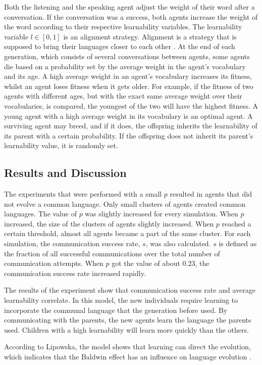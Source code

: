 Both the listening and the speaking agent adjust the weight of their word after a conversation. If the conversation was a success, both agents increase the weight of the word according to their respective learnability variables. The learnability variable $ l \in [0, 1]$ is an alignment strategy. Alignment is a strategy that is supposed to bring their languages closer to each other \citep{steels2012experiments}. At the end of each generation, which consists of several conversations between agents, some agents die based on a probability set by the average weight in the agent's vocabulary and its age. A high average weight in an agent's vocabulary increases its fitness, whilst an agent loses fitness when it gets older. For example, if the fitness of two agents with different ages, but with the exact same average weight over their vocabularies, is compared, the youngest of the two will have the highest fitness. A young agent with a high average weight in its vocabulary is an optimal agent. A surviving agent may breed, and if it does, the offspring inherits the learnability of its parent with a certain probability. If the offspring does not inherit its parent's learnability value, it is randomly set.

\subsection{Results and Discussion}
The experiments that were performed with a small $p$ resulted in agents that did not evolve a common language. Only small clusters of agents created common languages. The value of $p$ was slightly increased for every simulation. When $p$ increased, the size of the clusters of agents slightly increased. When $p$ reached a certain threshold, almost all agents became a part of the same cluster. For each simulation, the communication success rate, $s$, was also calculated. $s$ is defined as the fraction of all successful communications over the total number of communication attempts. When $p$ got the value of about 0.23, the communication success rate increased rapidly. 

The results of the experiment show that communication success rate and average learnability correlate. In this model, the new individuals require learning to incorporate the communal language that the generation before used. By communicating with the parents, the new agents learn the language the parents used. Children with a high learnability will learn more quickly than the others. 

According to Lipowska, the model shows that learning can direct the evolution, which indicates that the Baldwin effect has an influence on language evolution \citep[Section 4]{lipowska2011naming}.

